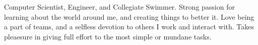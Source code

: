 

\begin{cvparagraph}

Computer Scientist, Engineer, and Collegiate Swimmer. Strong passion for learning about the world around me, and creating things to better it. Love being a part of teams, and a selfless devotion to others I work and interact with. Takes pleaesure in giving full effort to the most simple or mundane tasks.
\end{cvparagraph}
